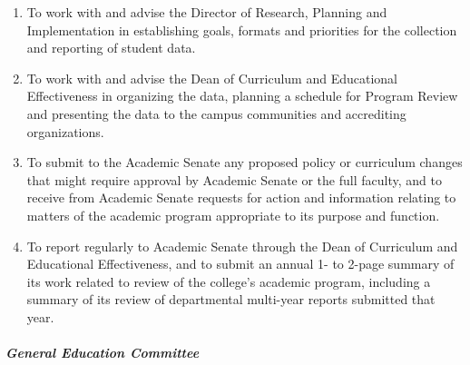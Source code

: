 \begin{enumerate}[label=\alph*)]
{\begin{enumerate}[label=\arabic*)]
{\begin{enumerate}[label=(\alph*)]
										\item{to provide the department with comments or suggestions to assist them in their preparation for the next review cycle;}
										\item{to encourage a campus conversation that establishes the value of a college-wide program review and addresses concerns as appropriate.}
									\end{enumerate}
								}
								\item{To work with and advise the Director of Research, Planning and Implementation in establishing goals, formats and priorities for the collection and reporting of student data.}
								\item{To work with and advise the Dean of Curriculum and Educational Effectiveness in organizing the data, planning a schedule for Program Review and presenting the data to the campus communities and accrediting organizations.}
								\item{To submit to the Academic Senate any proposed policy or curriculum changes that might require approval by Academic Senate or the full faculty, and to receive from Academic Senate requests for action and information relating to matters of the academic program appropriate to its purpose and function.}
								\item{To report regularly to Academic Senate through the Dean of Curriculum and Educational Effectiveness, and to submit an annual 1- to 2-page summary of its work related to review of the college's academic program, including a summary of its review of departmental multi-year reports submitted that year.}
							\end{enumerate}
						}
					\end{enumerate}
				\subparagraph{General Education Committee}
